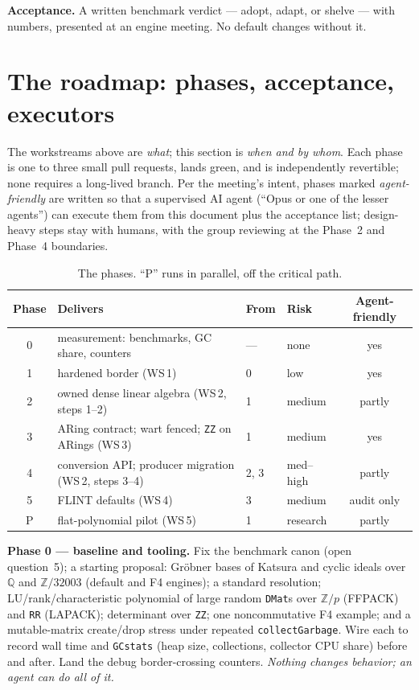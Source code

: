 \documentclass[11pt,oneside]{report}
\newcommand{\code}[1]{\textcolor{m2code}{\texttt{#1}}}
\begin{document}
\textbf{Acceptance.} A written benchmark verdict --- adopt, adapt, or
shelve --- with numbers, presented at an engine meeting. No default
changes without it.

\section{The roadmap: phases, acceptance, executors}
\label{sec:roadmap}

The workstreams above are \emph{what}; this section is \emph{when and by
whom}. Each phase is one to three small pull requests, lands green, and is
independently revertible; none requires a long-lived branch. Per the
meeting's intent, phases marked \emph{agent-friendly} are written so that
a supervised AI agent (``Opus or one of the lesser agents'') can execute
them from this document plus the acceptance list; design-heavy steps stay
with humans, with the group reviewing at the Phase~2 and Phase~4
boundaries.

\begin{table}[htbp]
\centering\small
{}
\begin{tabular}{@{}clllc@{}}
\toprule
\textbf{Phase} & \textbf{Delivers} & \textbf{From} & \textbf{Risk} & \textbf{Agent-friendly} \\
\midrule
0 & measurement: benchmarks, GC share, counters & --- & none & yes \\
1 & hardened border (WS\,1) & 0 & low & yes \\
2 & owned dense linear algebra (WS\,2, steps 1--2) & 1 & medium & partly \\
3 & ARing contract; wart fenced; \code{ZZ} on ARings (WS\,3) & 1 & medium & yes \\
4 & conversion API; producer migration (WS\,2, steps 3--4) & 2, 3 & med--high & partly \\
5 & FLINT defaults (WS\,4) & 3 & medium & audit only \\
P & flat-polynomial pilot (WS\,5) & 1 & research & partly \\
\bottomrule
\end{tabular}
\caption{The phases. ``P'' runs in parallel, off the critical path.}
\label{tab:phases}
\end{table}

\textbf{Phase 0 --- baseline and tooling.} Fix the benchmark canon (open
question~5); a starting proposal: Gr\"obner bases of Katsura and cyclic
ideals over $\mathbb{Q}$ and $\mathbb{Z}/32003$ (default and F4 engines); a
standard resolution; LU/rank/characteristic polynomial of large random
\code{DMat}s over $\mathbb{Z}/p$ (FFPACK) and \code{RR} (LAPACK);
determinant over \code{ZZ}; one noncommutative F4 example; and a
mutable-matrix create/drop stress under repeated \code{collectGarbage}.
Wire each to record wall time and \code{GCstats} (heap size, collections,
collector CPU share) before and after. Land the debug border-crossing
counters. \emph{Nothing changes behavior; an agent can do all of it.}
\end{document}
